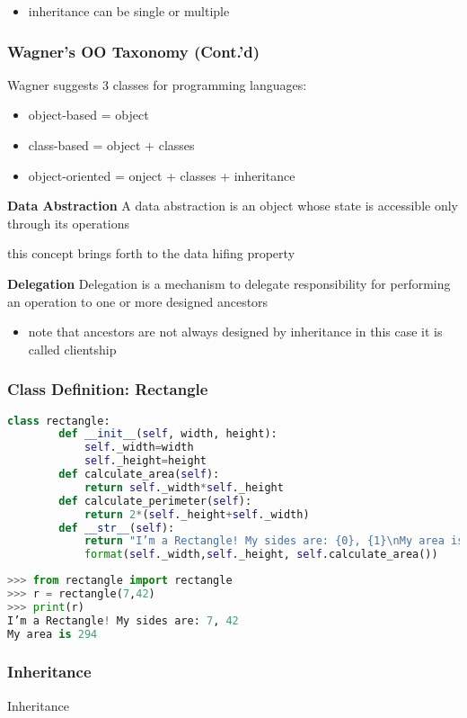 \begin{itemize}
	\item  inheritance can be single or multiple
\end{itemize}

\subsubsection{Wagner’s OO Taxonomy (Cont.’d)}

Wagner suggests 3 classes for programming languages:

\begin{itemize}
	\item object-based = object
	\item class-based = object + classes
	\item object-oriented = onject + classes + inheritance
\end{itemize}

\textbf{Data Abstraction}
A data abstraction is an object whose state is accessible only through its operations

\begin{itemize}
	\iem this concept brings forth to the data hifing property
\end{itemize}

\textbf{Delegation}
Delegation is a mechanism to delegate responsibility for performing an operation to one or more designed ancestors

\begin{itemize}
		\item note that ancestors are not always designed by inheritance in this case it is called clientship
\end{itemize}

\subsubsection{Class Definition: Rectangle}

\begin{lstlisting}[language=Python]
	class rectangle:
		def __init__(self, width, height):
			self._width=width
			self._height=height
		def calculate_area(self):
			return self._width*self._height
		def calculate_perimeter(self):
			return 2*(self._height+self._width)
		def __str__(self):
			return "I’m a Rectangle! My sides are: {0}, {1}\nMy area is {2}".\
			format(self._width,self._height, self.calculate_area())
\end{lstlisting}

\begin{lstlisting}[language=Python]
>>> from rectangle import rectangle
>>> r = rectangle(7,42)
>>> print(r)
I’m a Rectangle! My sides are: 7, 42
My area is 294
\end{lstlisting}

\subsubsection{Inheritance}

Inheritance 


